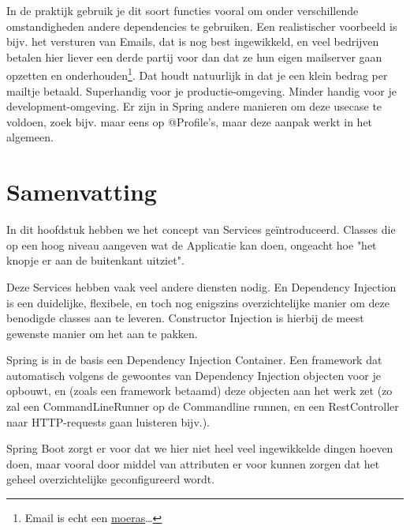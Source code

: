 In de praktijk gebruik je dit soort functies vooral om onder verschillende omstandigheden andere 
dependencies te gebruiken. Een realistischer voorbeeld is bijv. het versturen van Emails, dat is 
nog best ingewikkeld, en veel bedrijven betalen hier liever een derde partij voor dan dat ze hun 
eigen mailserver gaan opzetten en onderhouden\footnote{Email is echt een \href{https://cfenollosa.com/blog/after-self-hosting-my-email-for-twenty-three-years-i-have-thrown-in-the-towel-the-oligopoly-has-won.html}{moeras}\ldots}.
Dat houdt natuurlijk in dat je een klein bedrag per mailtje betaald. Superhandig voor je productie-omgeving.
Minder handig voor je development-omgeving. Er zijn in Spring andere manieren om deze usecase te voldoen,
zoek bijv. maar eens op @Profile's, maar deze aanpak werkt in het algemeen.


\section{Samenvatting}

In dit hoofdstuk hebben we het concept van Services geïntroduceerd. Classes die op een hoog niveau
aangeven wat de Applicatie kan doen, ongeacht hoe "het knopje er aan de buitenkant uitziet".

Deze Services hebben vaak veel andere diensten nodig. En Dependency Injection is een duidelijke,
flexibele, en toch nog enigszins overzichtelijke manier om deze benodigde classes aan te leveren. 
Constructor Injection is hierbij de meest gewenste manier om het aan te pakken.

Spring is in de basis een Dependency Injection Container. Een framework dat automatisch volgens 
de gewoontes van Dependency Injection objecten voor je opbouwt, en (zoals een framework betaamd)
deze objecten aan het werk zet (zo zal een CommandLineRunner op de Commandline runnen, en een RestController
naar HTTP-requests gaan luisteren bijv.).

Spring Boot zorgt er voor dat we hier niet heel veel ingewikkelde dingen hoeven doen, maar vooral 
door middel van attributen er voor kunnen zorgen dat het geheel overzichtelijke geconfigureerd wordt.
